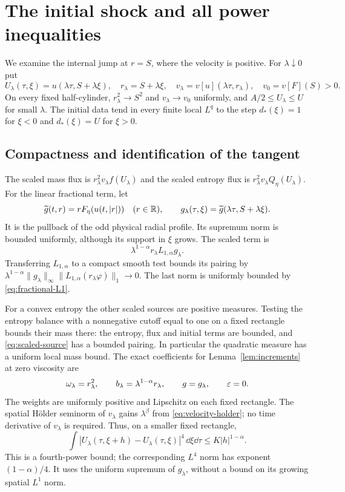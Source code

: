 \section{The initial shock and all power inequalities}\label{sec:shock}

We examine the internal jump at $r=S$, where the velocity is positive.
For $\lambda\downarrow0$ put
\begin{equation}\label{eq:tangent}
 U_\lambda(\tau,\xi)=u(\lambda\tau,S+\lambda\xi),\quad
 r_\lambda=S+\lambda\xi,\quad
 v_\lambda=v[u](\lambda\tau,r_\lambda),\quad v_0=v[F](S)>0.
\end{equation}
On every fixed half-cylinder, $r_\lambda^2\to S^2$ and
$v_\lambda\to v_0$ uniformly, and $A/2\leq U_\lambda\leq U$ for
small $\lambda$. The initial data tend in every finite local $L^q$ to
the step $d_*(\xi)=1$ for $\xi<0$ and $d_*(\xi)=U$ for $\xi>0$.

\subsection{Compactness and identification of the tangent}

The scaled mass flux is $r_\lambda^2v_\lambda f(U_\lambda)$ and the
scaled entropy flux is $r_\lambda^2v_\lambda Q_\eta(U_\lambda)$.
For the linear fractional term, let
\[
 \widetilde g(t,r)=rF_\eta(u(t,|r|))\quad(r\in\mathbb R),\qquad
 g_\lambda(\tau,\xi)=\widetilde g(\lambda\tau,S+\lambda\xi).
\]
It is the pullback of the odd physical radial profile. Its supremum norm
is bounded uniformly, although its support in $\xi$ grows. The scaled term is
\begin{equation}\label{eq:scaled-source}
 \lambda^{1-\alpha}r_\lambda L_{1,\alpha}g_\lambda.
\end{equation}
Transferring $L_{1,\alpha}$ to a compact smooth test bounds its pairing by
$\lambda^{1-\alpha}\|g_\lambda\|_\infty
\|L_{1,\alpha}(r_\lambda\varphi)\|_1\to0$.
The last norm is uniformly bounded by \eqref{eq:fractional-L1}.

For a convex entropy the other scaled sources are positive measures.
Testing the entropy balance with a nonnegative cutoff equal to one on a
fixed rectangle bounds their mass there: the entropy, flux and initial
terms are bounded, and \eqref{eq:scaled-source} has a bounded pairing.
In particular the quadratic measure has a uniform local mass bound.
The exact coefficients for Lemma~\ref{lem:increments} at zero viscosity are
\[
 \omega_\lambda=r_\lambda^2,\qquad
 b_\lambda=\lambda^{1-\alpha}r_\lambda,\qquad
 g=g_\lambda,\qquad\varepsilon=0.
\]
The weights are uniformly positive and Lipschitz on each fixed rectangle.
The spatial H\"older seminorm of $v_\lambda$ gains $\lambda^\beta$ from
\eqref{eq:velocity-holder}; no time derivative of $v_\lambda$ is required.
Thus, on a smaller fixed rectangle,
\begin{equation}\label{eq:scaled-increments}
 \int|U_\lambda(\tau,\xi+h)-U_\lambda(\tau,\xi)|^4\,\dd\xi\dd\tau
 \leq K|h|^{1-\alpha}.
\end{equation}
This is a fourth-power bound; the corresponding $L^4$ norm has exponent
$(1-\alpha)/4$. It uses the uniform supremum of $g_\lambda$, without
a bound on its growing spatial $L^1$ norm.

